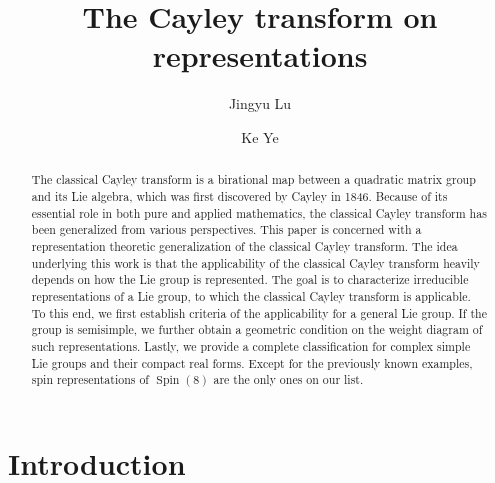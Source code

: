 \documentclass[11pt,reqno]{amsart}
\title{The Cayley transform on representations}
\author[J.~Y.~Lu]{Jingyu Lu}
\author[K.~Ye]{Ke Ye }
\DeclareMathOperator{\Spin}{Spin}
\begin{document}
%
\begin{abstract}
The classical Cayley transform is a birational map between a quadratic matrix group and its Lie algebra,  which was first discovered by Cayley in 1846.  Because of its essential role in both pure and applied mathematics,  the classical Cayley transform has been generalized from various perspectives.  This paper is concerned with a representation theoretic generalization of the classical Cayley transform.  The idea underlying this work is that the applicability of the classical Cayley transform heavily depends on how the Lie group is represented.  The goal is to characterize irreducible representations of a Lie group,  to which the classical Cayley transform is applicable.  To this end,  we first establish criteria of the applicability for a general Lie group.  If the group is semisimple,  we further obtain a geometric condition on the weight diagram of such representations.  Lastly,  we provide a complete classification for complex simple  Lie groups and their compact real forms.  Except for the previously known examples,  spin representations of $\Spin(8)$ are the only ones on our list.
\end{abstract}
\maketitle
\section{Introduction}
\end{document}
